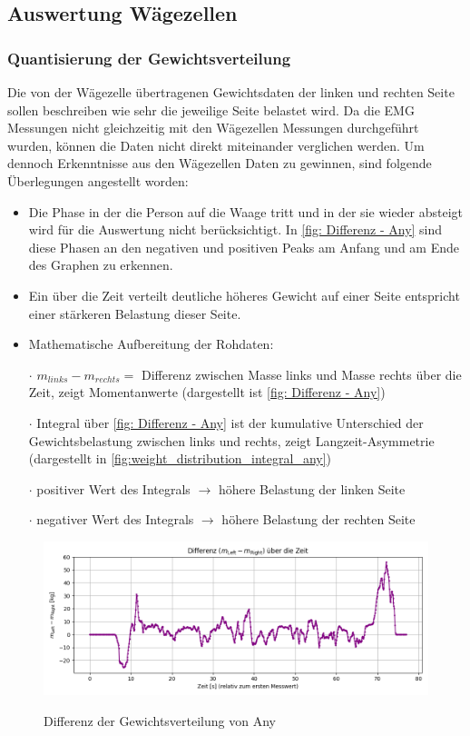 \subsection{Auswertung Wägezellen}
\subsubsection{Quantisierung der Gewichtsverteilung}
Die von der Wägezelle übertragenen Gewichtsdaten der linken und rechten Seite sollen beschreiben wie sehr die jeweilige Seite belastet wird.
Da die EMG Messungen nicht gleichzeitig mit den Wägezellen Messungen durchgeführt wurden, können die Daten nicht direkt miteinander verglichen werden.
Um dennoch Erkenntnisse aus den Wägezellen Daten zu gewinnen, sind folgende Überlegungen angestellt worden:
\begin{itemize}
  \item Die Phase in der die Person auf die Waage tritt und in der sie wieder absteigt wird für die Auswertung nicht berücksichtigt. 
  In \autoref{fig: Differenz - Any} sind diese Phasen an den negativen und positiven Peaks am Anfang und am Ende des Graphen zu erkennen. 
  \item Ein über die Zeit verteilt deutliche höheres Gewicht auf einer Seite entspricht einer stärkeren Belastung dieser Seite.
  \item Mathematische Aufbereitung der Rohdaten: 
    \item[$\cdot$] $m_{links} - m_{rechts} =$ Differenz zwischen Masse links und Masse rechts über die Zeit, zeigt Momentanwerte (dargestellt ist \autoref{fig: Differenz - Any})
    \item[$\cdot$] Integral über \autoref{fig: Differenz - Any} ist der kumulative Unterschied der Gewichtsbelastung zwischen links und rechts, zeigt Langzeit-Asymmetrie (dargestellt in \autoref{fig:weight_distribution_integral_any})
    \item[$\cdot$] positiver Wert des Integrals $\rightarrow$ höhere Belastung der linken Seite
    \item[$\cdot$] negativer Wert des Integrals $\rightarrow$ höhere Belastung der rechten Seite 
\end{itemize}

\begin{figure}
  \centering
  \includegraphics[width=0.7\linewidth]{img/pyplots/Differenz - Any.png}\\
  \caption{Differenz der Gewichtsverteilung von Any}
  \label{fig: Differenz - Any}
\end{figure}

